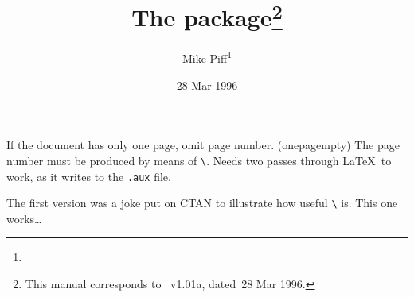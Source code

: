 \documentclass[pagesize=auto, DIV=10, fontsize=14pt, parskip=full]{scrartcl}
\title{The \pkg{onepagem} package\thanks{This manual corresponds to \pkg{onepagem.sty}~v1.01a, dated~28 Mar 1996.}}
\author{Mike Piff\thanks{\mail{M.Piff@sheffield.ac.uk}}}
\date{28 Mar 1996}
\makeatletter
\newcommand*{\cs}[1]{\texttt{\textbackslash#1}}
\newcommand*{\cmd}[1]{\cs{\expandafter\@gobble\string#1}}
\makeatother
\begin{document}
\maketitle

If the document has only one page, omit page number. (onepagempty)
The page number must be produced by means of \cmd{\thepage}.
Needs two passes through \LaTeX\ to work, as it writes to the {\tt .aux} file.

The first version was a joke put on CTAN to illustrate how useful
\cmd{\AtEndDocument} is.  This one works\dots
\end{document}
